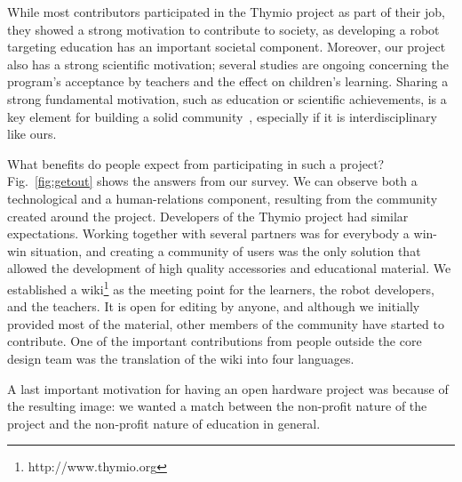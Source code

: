 \documentclass[letterpaper, 10 pt, conference]{ieeeconf}  %
\begin{document}
While most contributors participated in the Thymio project as part of their job, they showed a strong motivation to contribute to society, as developing a robot targeting education has an important societal component.
Moreover, our project also has a strong scientific motivation; several studies are ongoing concerning the program's acceptance by teachers and the effect on children's learning.
Sharing a strong fundamental motivation, such as education or scientific achievements, is a key element for building a solid community~\cite{Stahlbrost2011}, especially if it is interdisciplinary like ours.

What benefits do people expect from participating in such a project? 
Fig.~\ref{fig:getout} shows the answers from our survey.
We can observe both a technological and a human-relations component, resulting from the community created around the project. 
Developers of the Thymio project had similar expectations.
Working together with several partners was for everybody a win-win situation, and creating a community of users was the only solution that allowed the development of high quality accessories and educational material.
We established a wiki\footnote{http://www.thymio.org} as the meeting point for the learners, the robot developers, and the teachers.
It is open for editing by anyone, and although we initially provided most of the material, other members of the community have started to contribute.
One of the important contributions from people outside the core design team was the translation of the wiki into four languages.

A last important motivation for having an open hardware project was because of the resulting image: we wanted a match between the non-profit nature of the project and the non-profit nature of education in general. 
\end{document}
